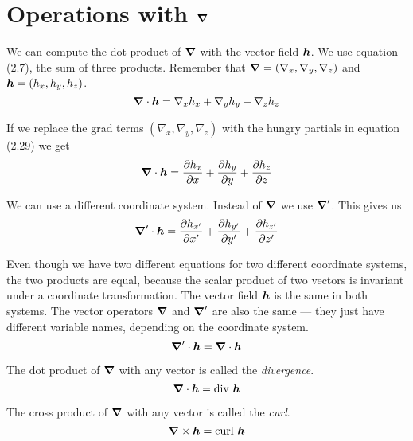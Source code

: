 \section{Operations with $\boldsymbol{\nabla}$}

We can compute the dot product of $\boldsymbol{\nabla}$ with the vector field $\boldsymbol{h}$.
We use equation (2.7), the sum of three products.
Remember that $\boldsymbol{\nabla} = (\nabla_x, \nabla_y, \nabla_z)$ and $\boldsymbol{h} = (h_x,h_y,h_z)$.
\begin{equation}
  \boldsymbol{\nabla} \cdot \boldsymbol{h} = \nabla_x h_x + \nabla_y h_y + \nabla_z h_z
\end{equation}

If we replace the grad terms $(\nabla_x, \nabla_y, \nabla_z)$ with
the hungry partials in equation (2.29) we get
\begin{equation}
  \boldsymbol{\nabla} \cdot \boldsymbol{h} = \frac{\partial h_x}{\partial x} + \frac{\partial h_y}{\partial y} + \frac{\partial h_z}{\partial z}
\end{equation}

We can use a different coordinate system.
Instead of $\boldsymbol{\nabla}$ we use $\boldsymbol{\nabla}'$.  This gives us
\begin{equation}
  \boldsymbol{\nabla}' \cdot \boldsymbol{h} = \frac{\partial h_{x'}}{\partial x'} + \frac{\partial h_{y'}}{\partial y'} + \frac{\partial h_{z'}}{\partial z'}
\end{equation}

Even though we have two different equations for two different coordinate systems,
the two products are equal, because the scalar product of two vectors is invariant 
under a coordinate transformation.
The vector field $\boldsymbol{h}$ is the same in both systems.
The vector operators $\boldsymbol{\nabla}$ and $\boldsymbol{\nabla}'$ are also the same ---
they just have different variable names, depending on the coordinate system.
\begin{equation}
  \boldsymbol{\nabla}' \cdot \boldsymbol{h} = \boldsymbol{\nabla} \cdot \boldsymbol{h}
\end{equation}

The dot product of $\boldsymbol{\nabla}$ with any vector is called the \emph{divergence}.
\begin{equation}
  \boldsymbol{\nabla} \cdot \boldsymbol{h} = \mathrm{div\ } \boldsymbol{h}
\end{equation}

The cross product of $\boldsymbol{\nabla}$ with any vector is called the \emph{curl}.
\begin{equation}
  \boldsymbol{\nabla} \times \boldsymbol{h} = \mathrm{curl\ } \boldsymbol{h}
\end{equation}

